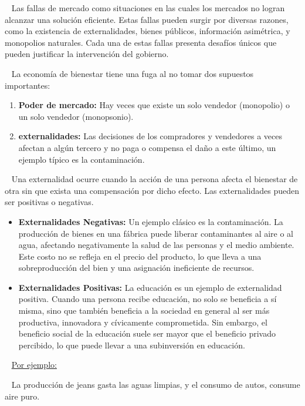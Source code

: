\documentclass[
  letterpaper,
  DIV=11,
  numbers=noendperiod]{scrreport}
\begin{document}
~ Las fallas de mercado como situaciones en las cuales los mercados no
logran alcanzar una solución eficiente. Estas fallas pueden surgir por
diversas razones, como la existencia de externalidades, bienes públicos,
información asimétrica, y monopolios naturales. Cada una de estas fallas
presenta desafíos únicos que pueden justificar la intervención del
gobierno.

~ La economía de bienestar tiene una fuga al no tomar dos supuestos
importantes:

\begin{enumerate}
\def\labelenumi{\arabic{enumi}.}
\item
  \textbf{Poder de mercado:} Hay veces que existe un solo vendedor
  (monopolio) o un solo vendedor (monopsonio).
\item
  \textbf{externalidades:} Las decisiones de los compradores y
  vendedores a veces afectan a algún tercero y no paga o compensa el
  daño a este último, un ejemplo típico es la contaminación.
\end{enumerate}

~ Una externalidad ocurre cuando la acción de una persona afecta el
bienestar de otra sin que exista una compensación por dicho efecto. Las
externalidades pueden ser positivas o negativas.

\begin{itemize}
\item
  \textbf{Externalidades Negativas:} Un ejemplo clásico es la
  contaminación. La producción de bienes en una fábrica puede liberar
  contaminantes al aire o al agua, afectando negativamente la salud de
  las personas y el medio ambiente. Este costo no se refleja en el
  precio del producto, lo que lleva a una sobreproducción del bien y una
  asignación ineficiente de recursos.
\item
  \textbf{Externalidades Positivas:} La educación es un ejemplo de
  externalidad positiva. Cuando una persona recibe educación, no solo se
  beneficia a sí misma, sino que también beneficia a la sociedad en
  general al ser más productiva, innovadora y cívicamente comprometida.
  Sin embargo, el beneficio social de la educación suele ser mayor que
  el beneficio privado percibido, lo que puede llevar a una subinversión
  en educación.
\end{itemize}

~ \ul{Por ejemplo:}

~ La producción de jeans gasta las aguas limpias, y el consumo de autos,
consume aire puro.
\end{document}

